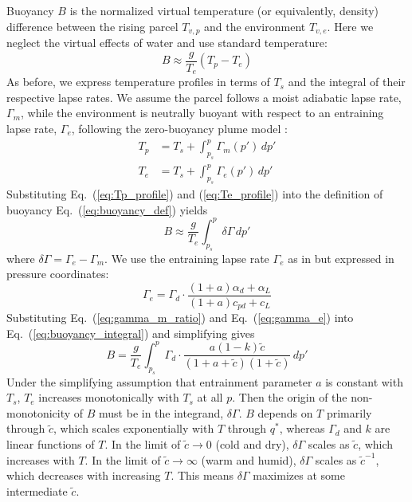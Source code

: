 \documentclass[draft,twocol]{ametsocV6.1}
\begin{document}
Buoyancy $B$ is the normalized virtual temperature (or equivalently, density) difference between the rising parcel $T_{v,p}$ and the environment $T_{v,e}$. Here we neglect the virtual effects of water and use standard temperature:
\begin{equation}
B\approx\frac{g}{T_e}(T_p-T_e) \label{eq:buoyancy_def}
\end{equation}
As before, we express temperature profiles in terms of $T_s$ and the integral of their respective lapse rates. We assume the parcel follows a moist adiabatic lapse rate, $\Gamma_m$, while the environment is neutrally buoyant with respect to an entraining lapse rate, $\Gamma_e$, following the zero-buoyancy plume model \citep{singh2013}:
\begin{align}
T_p&=T_s+\int_{p_s}^p \Gamma_m(p') \, dp' \label{eq:Tp_profile} \\
T_e&=T_s+\int_{p_s}^p \Gamma_e(p') \, dp' \label{eq:Te_profile}
\end{align}
Substituting Eq.~(\ref{eq:Tp_profile}) and (\ref{eq:Te_profile}) into the definition of buoyancy Eq.~(\ref{eq:buoyancy_def}) yields
\begin{equation}
B\approx\frac{g}{T_e}\int_{p_s}^p \delta \Gamma \, dp' \label{eq:buoyancy_integral}
\end{equation}
where $\delta\Gamma = \Gamma_e - \Gamma_m$. We use the entraining lapse rate $\Gamma_e$ as in \cite{romps2016} but expressed in pressure coordinates:
\begin{equation}
\Gamma_e = \Gamma_d \cdot \frac{(1+a)\alpha_d + \alpha_L}{(1+a)c_{pd}+c_L} \label{eq:gamma_e}
\end{equation}
Substituting Eq.~(\ref{eq:gamma_m_ratio}) and Eq.~(\ref{eq:gamma_e}) into Eq.~(\ref{eq:buoyancy_integral}) and simplifying gives
\begin{equation}
    B = \frac{g}{T_e}\int_{p_s}^p \Gamma_d \cdot \frac{a(1-k)\tilde{c}}{(1+a+\tilde{c})(1+\tilde{c})} \, dp' \label{eq:buoyancy_final}
\end{equation}
Under the simplifying assumption that entrainment parameter $a$ is constant with $T_s$, $T_e$ increases monotonically with $T_s$ at all $p$. Then the origin of the non-monotonicity of $B$ must be in the integrand, $\delta \Gamma$. $B$ depends on $T$ primarily through $\tilde{c}$, which scales exponentially with $T$ through $q^*$, whereas $\Gamma_d$ and $k$ are linear functions of $T$. In the limit of $\tilde{c} \to 0$ (cold and dry), $\delta\Gamma$ scales as $\tilde{c}$, which increases with $T$. In the limit of $\tilde{c} \to \infty$ (warm and humid), $\delta\Gamma$ scales as $\tilde{c}^{-1}$, which decreases with increasing $T$. This means $\delta \Gamma$ maximizes at some intermediate $\tilde{c}$.
\end{document}
